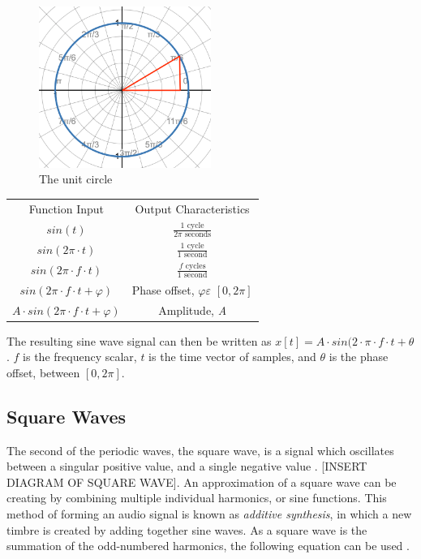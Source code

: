 \begin{figure}
	\centering
	\includegraphics[width=0.5\textwidth]{figures/unit-circle.png}
	\caption{The unit circle}
	\label{fig:unit-circle}
\end{figure}

\begin{center}
    \begin{tabular}{c c}
        Function Input & Output Characteristics \\
        $sin(t)$ & $\frac{1 \textrm{ cycle}}{2\pi \textrm{ seconds}}$\\
        $sin(2\pi \cdot t)$ & $\frac{1 \textrm{ cycle}}{1 \textrm{ second}}$\\
        $sin(2\pi \cdot f \cdot t)$ & $\frac{f \textrm{ cycles}}{1 \textrm{ second}}$\\
        $sin(2\pi \cdot f \cdot t + \varphi)$ & Phase offset, $\varphi \varepsilon$ $[0, 2\pi]$\\
        $A \cdot sin(2\pi \cdot f \cdot t + \varphi)$ & Amplitude, \textit{A}
    \end{tabular}
\end{center}
The resulting sine wave signal can then be written as $x[t] = A \cdot sin(2 \cdot \pi \cdot f \cdot t + \theta$. $f$ is the frequency scalar, $t$ is the time vector of samples, and $\theta$ is the phase offset, between $[0, 2\pi]$.

\subsection{Square Waves}
The second of the periodic waves, the square wave, is a signal which oscillates between a singular positive value, and a single negative value \cite{Tarr_2019}. [INSERT DIAGRAM OF SQUARE WAVE]. An approximation of a square wave can be creating by combining multiple individual harmonics, or sine functions. This method of forming an audio signal is known as \textit{additive synthesis}, in which a new timbre is created by adding together sine waves. As a square wave is the summation of the odd-numbered harmonics, the following equation can be used \cite{Tarr_2019}.

